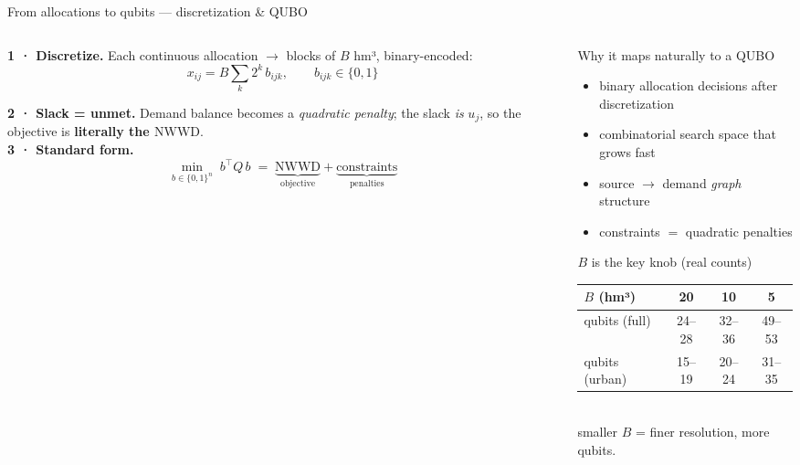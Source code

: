 \documentclass[aspectratio=169,10pt]{beamer}
\newcommand{\NWWD}{\ensuremath{\mathrm{NWWD}}}
\newcommand{\hlt}[1]{{\color{cyan}\bfseries #1}}
\begin{document}
\begin{frame}{From allocations to qubits — discretization \& QUBO}
\begin{columns}[T]
\begin{column}{0.5\textwidth}
\textbf{1 · Discretize.} Each continuous allocation $\to$ blocks of $B$ hm³,
binary-encoded:
\[ x_{ij} = B\textstyle\sum_k 2^k\, b_{ijk},\qquad b_{ijk}\in\{0,1\} \]

\textbf{2 · Slack = unmet.} Demand balance becomes a \emph{quadratic penalty};
the slack \emph{is} $u_j$, so the objective is \hlt{literally the \NWWD}.\\[4pt]

\textbf{3 · Standard form.}
\[ \min_{b\in\{0,1\}^n}\; b^{\top} Q\, b \;=\; \underbrace{\NWWD}_{\text{objective}} + \underbrace{\text{constraints}}_{\text{penalties}} \]
\end{column}

\begin{column}{0.5\textwidth}
\begin{block}{Why it maps naturally to a QUBO}
{\footnotesize
\begin{itemize}\setlength\itemsep{2pt}
\item binary allocation decisions after discretization
\item combinatorial search space that grows fast
\item source $\to$ demand \emph{graph} structure
\item constraints $=$ quadratic penalties
\end{itemize}}
\end{block}
\vspace{2pt}
\begin{block}{$B$ is the key knob (real counts)}
\centering
{\footnotesize
\begin{tabular}{lccc}
\toprule
$B$ (hm³) & 20 & 10 & 5\\
\midrule
qubits (full)  & 24--28 & 32--36 & 49--53\\
qubits (urban) & 15--19 & 20--24 & 31--35\\
\bottomrule
\end{tabular}}\\[3pt]
{\scriptsize smaller $B$ = finer resolution, more qubits.}
\end{block}
\end{column}
\end{columns}
\end{frame}
\end{document}

